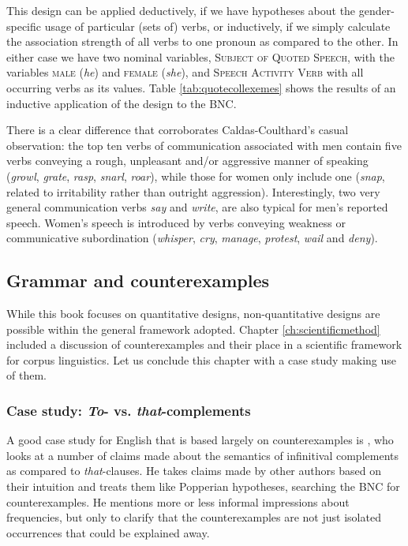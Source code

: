 This design can be applied deductively, if we have hypotheses about the gender-specific usage of particular (sets of) verbs, or inductively, if we simply calculate the association strength of all verbs to one pronoun as compared to the other. In either case we have two nominal variables, \textsc{Subject of Quoted Speech}, with the variables \textsc{male} (\textit{he}) and \textsc{female} (\textit{she}), and \textsc{Speech Activity Verb} with all occurring verbs as its values. Table \ref{tab:quotecollexemes} shows the results of an inductive application of the design to the BNC.

There is a clear difference that corroborates Caldas-Coulthard's casual observation: the top ten verbs of communication associated with men contain five verbs conveying a rough, unpleasant and/or aggressive manner of speaking (\textit{growl}, \textit{grate}, \textit{rasp}, \textit{snarl}, \textit{roar}), while those for women only include one (\textit{snap}, related to irritability rather than outright aggression). Interestingly, two very general communication verbs \textit{say} and \textit{write}, are also typical for men's reported speech. Women's speech is introduced by verbs conveying weakness or communicative subordination (\textit{whisper}, \textit{cry}, \textit{manage}, \textit{protest}, \textit{wail} and \textit{deny}).

\subsection{Grammar and counterexamples}
\label{sec:grammarandcounterexamples}

While this book focuses on quantitative designs, non-quantitative designs are possible within the general framework adopted. Chapter \ref{ch:scientificmethod} included a discussion of counterexamples and their place in a scientific framework for corpus linguistics. Let us conclude this chapter with a case study making use of them.

\subsubsection{Case study: \textit{To}- vs. \textit{that}-complements}
\label{sec:tovsthatcomplements}

A good case study for English that is based largely on counterexamples is \citet{rohdenburg_is_2003}, who looks at a number of claims made about the semantics of infinitival complements as compared to \textit{that}-clauses. He takes claims made by other authors based on their intuition and treats them like Popperian hypotheses, searching the BNC for counterexamples. He mentions more or less informal impressions about frequencies, but only to clarify that the counterexamples are not just isolated occurrences that could be explained away.

